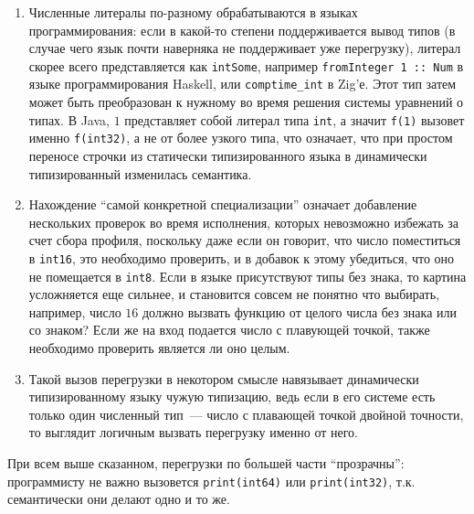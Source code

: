 \documentclass[times,specification,annotation]{itmo-student-thesis}
\begin{document}
\begin{enumerate}
	\item Численные литералы по-разному обрабатываются в языках программирования: если в какой-то степени поддерживается вывод типов (в случае чего язык почти наверняка не поддерживает уже перегрузку), литерал скорее всего представляется как \texttt{intSome}, например \texttt{fromInteger 1 :: Num} в языке программирования Haskell, или \texttt{comptime\_int} в Zig'е. Этот тип затем может быть преобразован к нужному во время решения системы уравнений о типах. В Java, $1$ представляет собой литерал типа \texttt{int}, а значит \texttt{f(1)} вызовет именно \texttt{f(int32)}, а не от более узкого типа, что означает, что при простом переносе строчки из статически типизированного языка в динамически типизированный изменилась семантика.
	\item Нахождение ``самой конкретной специализации'' означает добавление нескольких проверок во время исполнения, которых невозможно избежать за счет сбора профиля, поскольку даже если он говорит, что число поместиться в \texttt{int16}, это необходимо проверить, и в добавок к этому убедиться, что оно не помещается в \texttt{int8}. Если в языке присутствуют типы без знака, то картина усложняется еще сильнее, и становится совсем не понятно что выбирать, например, число $16$ должно вызвать функцию от целого числа без знака или со знаком? Если же на вход подается число с плавующей точкой, также необходимо проверить является ли оно целым.
	\item Такой вызов перегрузки в некотором смысле навязывает динамически типизированному языку чужую типизацию, ведь если в его системе есть только один численный тип~--- число с плавающей точкой двойной точности, то выглядит логичным вызвать перегрузку именно от него.
\end{enumerate}
При всем выше сказанном, перегрузки по большей части ``прозрачны'': программисту не важно вызовется \texttt{print(int64)} или \texttt{print(int32)}, т.к. семантически они делают одно и то же.
\end{document}
